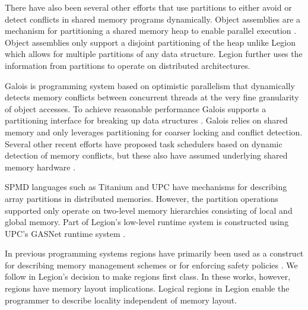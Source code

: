 There have also been several other efforts that use partitions to either avoid
or detect conflicts in shared memory programs dynamically.
Object assemblies are a mechanism for partitioning a shared memory
heap to enable parallel execution \cite{Lublinerman09}.  Object assemblies
only support a disjoint partitioning of the heap unlike Legion which
allows for multiple partitions of any data structure.  Legion further uses 
the information from partitions to operate on distributed architectures.

Galois is programming system based on optimistic parallelism that dynamically detects 
memory conflicts between concurrent threads at the very
fine granularity of object accesses.  To achieve reasonable performance
Galois supports a partitioning interface for breaking up data structures \cite{Kulkarni08}.  
Galois relies on shared memory
and only leverages partitioning for coarser locking and conflict detection.
Several other recent efforts have proposed task schedulers
based on dynamic detection of memory conflicts, but these also have assumed
underlying shared memory hardware \cite{VTN11,Tzenakis12,EYJD12}.

SPMD languages such as Titanium \cite{TIT98} and UPC \cite{UPC99} have
mechanisms for describing array partitions in distributed memories.
However, the partition operations supported only operate on two-level
memory hierarchies consisting of local and global memory. 
Part of Legion's
low-level runtime system is constructed using UPC's GASNet
runtime system \cite{GASNET07}.

In previous programming systems regions have primarily been used as a construct for
describing memory management schemes \cite{REAPS02,RC01}  
or for enforcing safety policies \cite{CYCLONE01}.  We follow \cite{RC01} in Legion's
decision to make regions first class.  In these works, however, regions have
memory layout implications.  Logical regions in Legion enable the programmer to
describe locality independent of memory layout.

